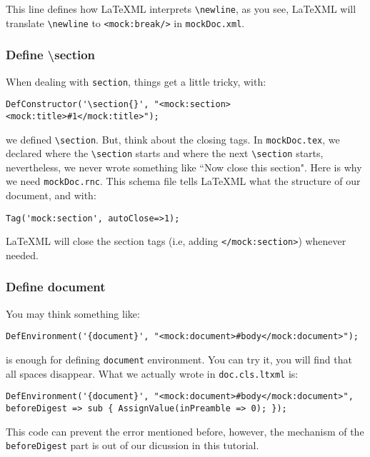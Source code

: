 \documentclass[a4paper]{article}
\begin{document}
\noindent This line defines how \LaTeX ML interprets \texttt{\textbackslash newline}, as you see, \LaTeX ML will translate \texttt{\textbackslash newline} to \texttt{<mock:break/>} in \texttt{mockDoc.xml}.\\

\subsubsection{Define \textbackslash section}
\noindent When dealing with \texttt{section}, things get a little tricky, with:
\begin{lstlisting}
DefConstructor('\section{}', "<mock:section><mock:title>#1</mock:title>");
\end{lstlisting}
we defined \texttt{\textbackslash section}. But, think about the closing tags. In \texttt{mockDoc.tex}, we declared where the \texttt{\textbackslash section} starts and where the next \texttt{\textbackslash section} starts, nevertheless, we never wrote something like ``Now close this section". Here is why we need \texttt{mockDoc.rnc}. This schema file tells \LaTeX ML what the structure of our document, and with:
\begin{lstlisting}
Tag('mock:section', autoClose=>1);
\end{lstlisting}
\LaTeX ML will close the section tags (i.e, adding \texttt{</mock:section>}) whenever needed. \\

\subsubsection{Define document}
You may think something like:
\begin{lstlisting}
DefEnvironment('{document}', "<mock:document>#body</mock:document>");
\end{lstlisting}
is enough for defining \texttt{document} environment. You can try it, you will find that all spaces disappear. What we actually wrote in \texttt{doc.cls.ltxml} is:
\begin{lstlisting}
DefEnvironment('{document}', "<mock:document>#body</mock:document>", beforeDigest => sub { AssignValue(inPreamble => 0); });
\end{lstlisting}
This code can prevent the error mentioned before, however, the mechanism of the \texttt{beforeDigest} part is out of our dicussion in this tutorial.\\
\end{document}

